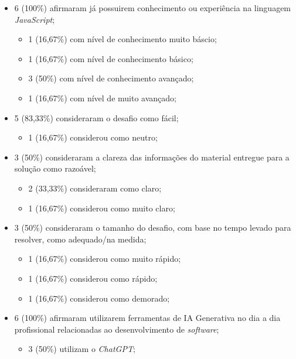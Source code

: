 \documentclass[english,brazilian]{UNISINOSartigo} %
\begin{document}
\begin{itemize}[leftmargin=1cm, itemsep=0.1em, topsep=0.1em]
    \item 6 (100\%) afirmaram já possuirem conhecimento ou experiência na linguagem \textit{JavaScript};
    \begin{itemize}[leftmargin=1.2cm, itemsep=0.1em, topsep=0.1em]
        \item 1 (16,67\%) com nível de conhecimento muito báscio;
        \item 1 (16,67\%) com nível de conhecimento básico;
        \item 3 (50\%) com nível de conhecimento avançado;
        \item 1 (16,67\%) com nível de muito avançado;
    \end{itemize}
    \item 5 (83,33\%) consideraram o desafio como fácil;
    \begin{itemize}[leftmargin=1.2cm, itemsep=0.1em, topsep=0.1em]
        \item 1 (16,67\%) considerou como neutro;
    \end{itemize}
    \item 3 (50\%) consideraram a clareza das informações do material entregue para a solução como razoável;
    \begin{itemize}[leftmargin=1.2cm, itemsep=0.1em, topsep=0.1em]
        \item 2 (33,33\%) consideraram como claro;
        \item 1 (16,67\%) considerou como muito claro;
    \end{itemize}
    \item 3 (50\%) consideraram o tamanho do desafio, com base no tempo levado para resolver, como adequado/na medida;
    \begin{itemize}[leftmargin=1.2cm, itemsep=0.1em, topsep=0.1em]
        \item 1 (16,67\%) considerou como muito rápido;
        \item 1 (16,67\%) considerou como rápido;
        \item 1 (16,67\%) considerou como demorado;
    \end{itemize}
    \item 6 (100\%) afirmaram utilizarem ferramentas de IA Generativa no dia a dia profissional relacionadas ao desenvolvimento de \textit{software};
    \begin{itemize}[leftmargin=1.2cm, itemsep=0.1em, topsep=0.1em]
        \item 3 (50\%) utilizam o \textit{ChatGPT};

\end{itemize}
\end{itemize}
\end{document}
